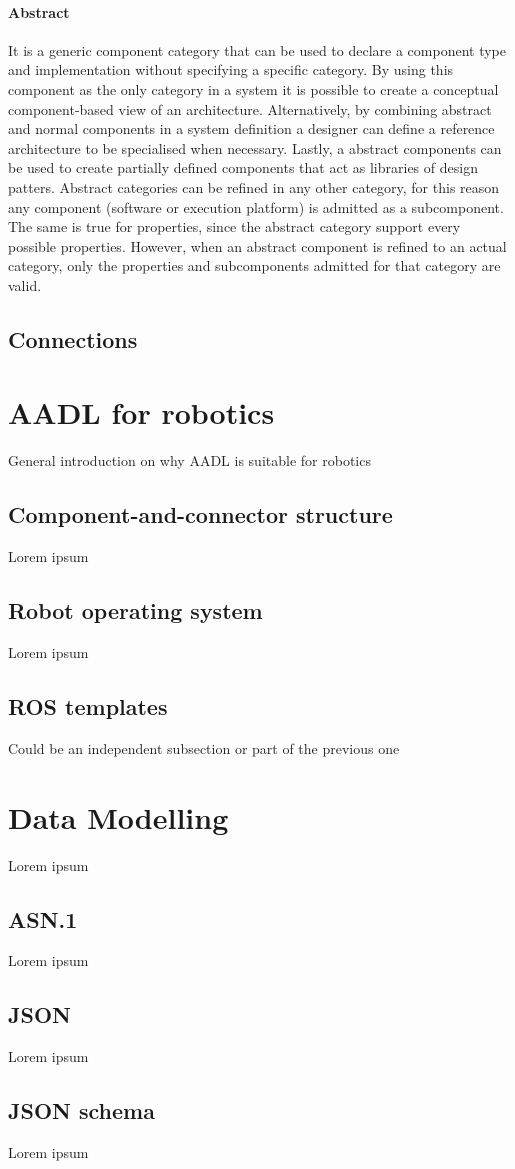 \paragraph{Abstract} It is a generic component category that can be used to declare a component type and implementation without specifying a specific category. By using this component as the only category in a system it is possible to create a conceptual component-based view of an architecture. Alternatively, by combining abstract and normal components in a system definition a designer can define a reference architecture to be specialised when necessary. Lastly, a abstract components can be used to create partially defined components that act as libraries of design patters. Abstract categories can be refined in any other category, for this reason any component (software or execution platform) is admitted as a subcomponent. The same is true for properties, since the abstract category support every possible properties. However, when an abstract component is refined to an actual category, only the properties and subcomponents admitted for that category are valid.

\subsection{Connections}


\section{AADL for robotics}
General introduction on why AADL is suitable for robotics

\subsection{Component-and-connector structure}
Lorem ipsum

\subsection{Robot operating system}
Lorem ipsum

\subsection{ROS templates}
Could be an independent subsection or part of the previous one

\section{Data Modelling}
Lorem ipsum

\subsection{ASN.1}
Lorem ipsum

\subsection{JSON}
Lorem ipsum

\subsection{JSON schema}
Lorem ipsum

